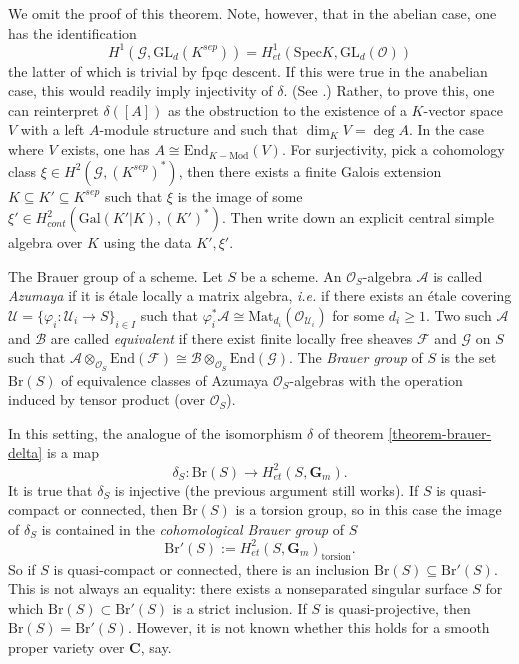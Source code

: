 \noindent
We omit the proof of this theorem. Note, however, that in the abelian case, one 
has the identification
$$
H^1 (\mathcal{G}, \text{GL}_d(K^{sep})) = H_{et}^1 (\text{Spec} K, 
\text{GL}_d(\mathcal{O}))
$$
the latter of which is trivial by fpqc descent. If this were true in the 
anabelian case, this would readily imply injectivity of $\delta$. (See 
\cite{SGA4.5}.) Rather, to prove this, one can reinterpret $\delta([A])$ as the 
obstruction to the existence of a $K$-vector space $V$ with a left $A$-module 
structure and such that $\dim_K V = \deg A$. In the case where $V$ exists, one 
has $A \cong \text{End}_{K-\text{Mod}} (V)$. For surjectivity, pick a 
cohomology class $\xi \in H^2(\mathcal{G}, (K^{sep})^*)$, then there exists a 
finite Galois extension $K \subseteq K' \subseteq K^{sep}$ such that $\xi$ is 
the image of some $\xi' \in H_{cont}^2(\text{Gal}(K'|K), (K')^*)$. Then write 
down an explicit central simple algebra over $K$ using the data $K', \xi'$.

\medskip\noindent
The Brauer group of a scheme.
Let $S$ be a scheme. An $\mathcal{O}_S$-algebra $\mathcal{A}$ is called 
{\it Azumaya} if it is \'etale locally a matrix algebra, {\it i.e.} if there 
exists an \'etale covering $\mathcal{U} = \{ \varphi_i : \mathcal{U}_i \to S 
\}_{i \in I}$ such that $\varphi_i^*\mathcal{A} \cong 
\text{Mat}_{d_i}(\mathcal{O}_{\mathcal{U}_i})$ for some $d_i \geq 1$. Two such 
$\mathcal{A}$ and $\mathcal{B}$ are called {\it equivalent} if there exist 
finite locally free sheaves $\mathcal{F}$ and $\mathcal{G}$ on $S$ such that 
$\mathcal{A} \otimes_{\mathcal{O}_S} \text{End}(\mathcal{F}) \cong \mathcal{B} 
\otimes_{\mathcal{O}_S} \text{End}(\mathcal{G})$. The {\it Brauer group} of 
$S$ is the set $\text{Br}(S)$ of equivalence classes of Azumaya 
$\mathcal{O}_S$-algebras with the operation induced by tensor product (over 
$\mathcal{O}_S$). 

\medskip\noindent
In this setting, the analogue of the isomorphism $\delta$ of theorem 
\ref{theorem-brauer-delta} is a map 
$$
\delta_S: \text{Br}(S) \to H_{et}^2(S,\mathbf{G}_m).
$$ 
It is true that $\delta_S$ is injective (the previous argument still works). If 
$S$ is quasi-compact or connected, then $\text{Br}(S)$ is a torsion group, so 
in this case the image of $\delta_S$ is contained in the {\it cohomological 
Brauer group} of $S$ 
$$
\text{Br}'(S) := H_{et}^2(S,\mathbf{G}_m)_\text{torsion}.
$$ 
So if $S$ is quasi-compact or connected, there is an inclusion $\text{Br}(S) 
\subseteq \text{Br}'(S)$. This is not always an equality: there exists a 
nonseparated singular surface $S$ for which $\text{Br}(S) \subset 
\text{Br}'(S)$ is a strict inclusion. If $S$ is quasi-projective, then 
$\text{Br}(S) = \text{Br}'(S)$. However, it is not known whether this holds for 
a smooth proper variety over $\mathbf{C}$, say.  


